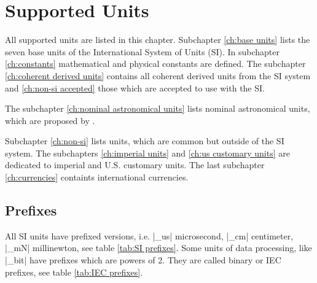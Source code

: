 \documentclass{ltxdoc}
\begin{document}
\newpage
\section{Supported Units}
\label{ch:Supported Units}

All supported units are listed in this chapter. Subchapter \ref{ch:base units} lists the seven base units of the International System of Units (SI). In subchapter \ref{ch:constants}  mathematical and physical constants are defined. The subchapter \ref{ch:coherent derived units} contains all coherent derived units from the SI system and \ref{ch:non-si accepted} those which are accepted to use with the SI.

The subchapter \ref{ch:nominal astronomical units} lists nominal astronomical units, which are proposed by \cite{iau16}.

Subchapter \ref{ch:non-si} lists units, which are common but outside of the SI system. The subchapters \ref{ch:imperial units} and \ref{ch:us customary units} are dedicated to imperial and U.S. customary units. The last subchapter \ref{ch:currencies} containts international currencies.


\renewcommand{\arraystretch}{1.5}

\subsection{Prefixes}

All SI units have prefixed versions, i.e. |_us| microsecond, |_cm| centimeter, |_mN| millinewton, see table \ref{tab:SI prefixes}. Some units of data processing, like |_bit| have prefixes which are powers of 2. They are called binary or IEC prefixes, see table \ref{tab:IEC prefixes}. \cite[121]{bipm06}
\end{document}
